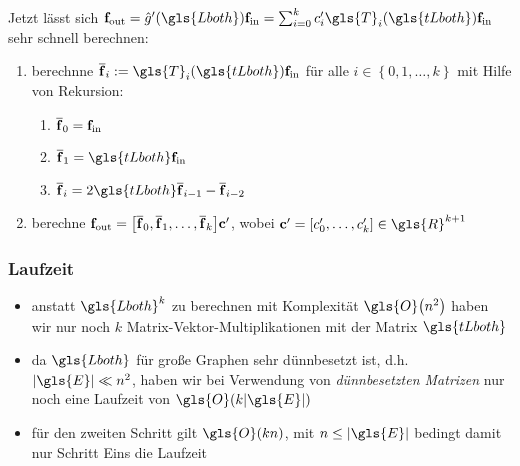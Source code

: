 Jetzt lässt sich $\ve{f}_{\mathrm{out}} = \hat g^{\prime}\left(\gls{Lboth}\right) \ve{f}_{\mathrm{in}} = \sum_{i=0}^k c^{\prime}_i \gls{T}_i \left(\gls{tLboth}\right) \ve{f}_{\mathrm{in}}$ sehr schnell berechnen:

\begin{enumerate}
  \item berechnne $\ve{\overline{f}}_i := \gls{T}_i \left(\gls{tLboth}\right) \ve{f}_{\mathrm{in}}$ für alle $i \in \left\{ 0, 1, \ldots, k \right\}$ mit Hilfe von Rekursion:
  \begin{enumerate}
    \item $\mathbf{\overline{f}}_0 = \mathbf{f}_{\mathrm{in}}$
    \item $\ve{\overline{f}}_1 = \gls{tLboth} \ve{f}_{\mathrm{in}}$
    \item $\ve{\overline{f}}_i = 2\gls{tLboth} \ve{\overline{f}}_{i-1} - \ve{\overline{f}}_{i-2}$
  \end{enumerate}
\item berechne $\ve{f}_{\mathrm{out}} = \left[\ve{\overline{f}}_0, \ve{\overline{f}}_1, \ldots, \ve{\overline{f}}_{k} \right] \ve{c}^{\prime}$, wobei $\ve{c}^{\prime} = \left[c^{\prime}_0, \ldots, c^{\prime}_k\right] \in \gls{R}^{k+1}$
\end{enumerate}

\subsubsection{Laufzeit}

 \begin{itemize}
   \item anstatt $\gls{Lboth}^k$ zu berechnen mit Komplexität $\gls{O}\left(n^2\right)$ haben wir nur noch $k$ Matrix-Vektor-Multiplikationen mit der Matrix $\gls{tLboth}$
   \item da $\gls{Lboth}$ für große Graphen sehr dünnbesetzt ist, d.h.\ $\left|\gls{E}\right| \ll n^2$, haben wir bei Verwendung von \emph{dünnbesetzten Matrizen} nur noch eine Laufzeit von $\gls{O}\left(k\left|\gls{E}\right|\right)$~\cite{Hammond, Defferrard}
   \item für den zweiten Schritt gilt $\gls{O}\left(kn\right)$, mit $n \leq \left|\gls{E}\right|$ bedingt damit nur Schritt Eins die Laufzeit
 \end{itemize}
